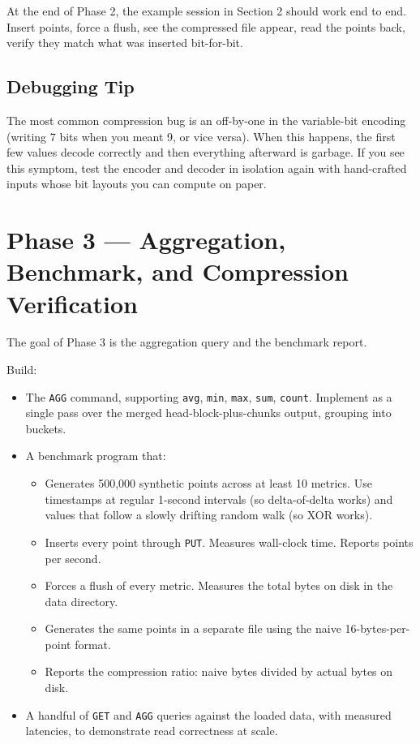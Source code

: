 \documentclass[11pt,a4paper]{article}
\begin{document}
At the end of Phase 2, the example session in Section 2 should work end to end. Insert points, force a flush, see the compressed file appear, read the points back, verify they match what was inserted bit-for-bit.

\subsection{Debugging Tip}
The most common compression bug is an off-by-one in the variable-bit encoding (writing 7 bits when you meant 9, or vice versa). When this happens, the first few values decode correctly and then everything afterward is garbage. If you see this symptom, test the encoder and decoder in isolation again with hand-crafted inputs whose bit layouts you can compute on paper.

\section{Phase 3 --- Aggregation, Benchmark, and Compression Verification}

The goal of Phase 3 is the aggregation query and the benchmark report.

Build:
\begin{itemize}
\item The \texttt{AGG} command, supporting \texttt{avg}, \texttt{min}, \texttt{max}, \texttt{sum}, \texttt{count}. Implement as a single pass over the merged head-block-plus-chunks output, grouping into buckets.
\item A benchmark program that:
  \begin{itemize}
  \item Generates 500{,}000 synthetic points across at least 10 metrics. Use timestamps at regular 1-second intervals (so delta-of-delta works) and values that follow a slowly drifting random walk (so XOR works).
  \item Inserts every point through \texttt{PUT}. Measures wall-clock time. Reports points per second.
  \item Forces a flush of every metric. Measures the total bytes on disk in the data directory.
  \item Generates the same points in a separate file using the naive 16-bytes-per-point format.
  \item Reports the compression ratio: naive bytes divided by actual bytes on disk.
  \end{itemize}
\item A handful of \texttt{GET} and \texttt{AGG} queries against the loaded data, with measured latencies, to demonstrate read correctness at scale.
\end{itemize}
\end{document}
